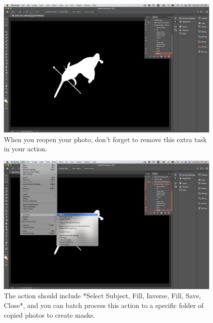 \documentclass[
]{book}
\begin{document}
\begin{figure}

{\centering \includegraphics[width=1\linewidth]{Figures/mask_2} 

}

\caption{When you reopen your photo, don't forget to remove this extra task in your action.}\label{fig:mask2}
\end{figure}

\begin{figure}

{\centering \includegraphics[width=1\linewidth]{Figures/mask_3} 

}

\caption{The action should include *Select Subject, Fill, Inverse, Fill, Save, Close*, and you can batch process this action to a specific folder of copied photos to create masks.}\label{fig:mask3}
\end{figure}
\end{document}
